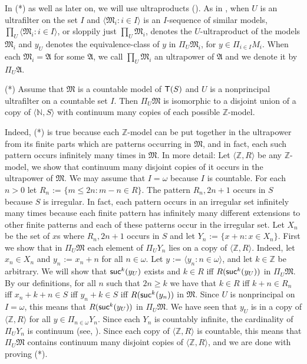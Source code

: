 \documentclass[12pt,leqno]{article}
\newcommand{\de}{\mbox{\ :=\ }}
\newcommand{\Mm}{\mbox{$\mathfrak M$}}
\newcommand{\Aa}{\mbox{$\mathfrak A$}}
\newcommand{\T}{\mbox{\sf T}}
\newcommand{\N}{\mathbb N}
\newcommand{\Z}{\mathbb Z}
\newcommand{\suc}{\mbox{\sf suc}}
\begin{document}
In (*) as well as later on, we will use ultraproducts (\cite[ch.4]{CK}).
As in \cite{CK}, when $U$ is an ultrafilter on the set $I$ and $\langle\Mm_i : i\in
I\rangle$ is an $I$-sequence of similar models,
$\prod_{U}\langle\Mm_i : i\in I\rangle$, or sloppily just
$\prod_{U}\Mm_i$, denotes the
$U$-ultraproduct of the models $\Mm_i$ and $y_U$ denotes the equivalence-class of $y$ in $\Pi_U\Mm_i$, for $y\in\Pi_{i\in I}M_i$.
When each $\Mm_i=\Aa$ for some $\Aa$, we call $\prod_{U}\Mm_i$ an
ultrapower of $\Aa$ and we denote it by $\Pi_U\Aa$.


\begin{description}
\item{(*)}
Assume that $\Mm$ is a countable model of $\T(S)$ and $U$
is a nonprincipal ultrafilter on a countable set $I$. Then
$\Pi_U\Mm$ is isomorphic to a disjoint union of a copy of $\langle\N,S\rangle$ with continuum
many copies of each possible $\Z$-model.
\end{description}
%
Indeed, (*) is true because each $\Z$-model can be put together in
the ultrapower from its finite parts which are patterns occurring in
$\Mm$, and in fact, each such pattern occurs infinitely many
times in $\Mm$. In more detail:
Let $\langle\Z,R\rangle$ be any $\Z$-model, we show that continuum 
many disjoint copies of it occurs in the ultrapower of $\Mm$. We may assume that $I=\omega$ because $I$ is countable. For each $n>0$ let $R_n\de\{m\le2n : m-n\in R\}$. The pattern $R_n,2n+1$ occurs in $S$ because $S$ is irregular. In fact, each pattern occurs in an irregular set infinitely many times because each finite pattern has infinitely many different extensions to other finite patterns and each of these patterns occur in the irregular set. Let $X_n$ be the set of $x$s where $R_n,2n+1$ occurs in $S$ and let $Y_n\de\{x+n : x\in X_n\}$. First we show that in $\Pi_U\Mm$ each element of $\Pi_U Y_n$ lies on a copy of $\langle\Z,R\rangle$.  Indeed, let  $x_n\in X_n$ and $y_n\de x_n+n$ for all $n\in\omega$. Let $y\de\langle y_n : n\in\omega\rangle$, and let $k\in\Z$ be arbitrary. We will show that $\suc^k(y_U)$ exists and $k\in R$ iff $R(\suc^k(y_U))$ in $\Pi_U\Mm$. By our definitions, for all $n$ such that $2n\ge k$ we have that $k\in R$ iff $k+n\in R_n$ iff $x_n+k+n\in S$ iff $y_n+k\in S$ iff $R(\suc^k(y_n))$ in $\Mm$. Since $U$ is nonprincipal on $I=\omega$, this means that $R(\suc^k(y_U))$ in $\Pi_U\Mm$. We have seen that $y_U$ is in a copy of $\langle\Z,R\rangle$ for all $y\in\Pi_{n\in\omega} Y_n$. Since each $Y_n$ is countably infinite, the cardinality of $\Pi_U Y_n$ is continuum (see, \cite[Prop.4.3.9]{CK}). Since each copy of $\langle\Z,R\rangle$ is countable, this means that $\Pi_U\Mm$ contains continuum many disjoint copies of $\langle\Z,R\rangle$, and we are done with proving (*).
\end{document}
